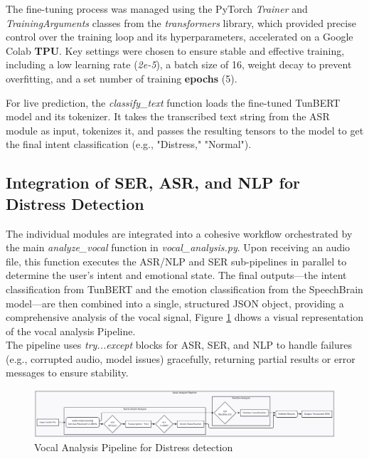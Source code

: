 \documentclass[12pt,a4paper,oneside,english]{book}
\begin{document}
{The fine-tuning process was managed using the PyTorch \textit{Trainer} and \textit{TrainingArguments} classes from the \textit{transformers} library, which provided precise control over the training loop and its hyperparameters, accelerated on a Google Colab \textbf{TPU}. 
Key settings were chosen to ensure stable and effective training, including a low learning rate (\textit{2e-5}), 
a batch size of 16, weight decay to prevent overfitting, and a set number of training \textbf{epochs} (5).

For live prediction, the \textit{classify\_text} function loads the fine-tuned TunBERT model and its tokenizer. It takes the transcribed text string from the ASR module as input, tokenizes it, and passes the 
resulting tensors to the model to get the final intent classification (e.g., "Distress," "Normal").

\subsection{Integration of SER, ASR, and NLP for Distress Detection}%
\label{integration_ser_asr_nlp}
The individual modules are integrated into a cohesive workflow orchestrated by the main \textit{analyze\_vocal} function in \textit{vocal\_analysis.py}. Upon receiving an audio file, this function 
executes the ASR/NLP and SER sub-pipelines in parallel to determine the user's intent and emotional state. The final outputs—the intent classification from TunBERT and the emotion classification from 
the SpeechBrain model—are then combined into a single, structured JSON object, providing a comprehensive analysis of the vocal signal, Figure \ref{fig:vocal_pipe} dhows a visual representation of the vocal analysis Pipeline.
\\The pipeline uses \textit{try...except} blocks for ASR, SER, and NLP to handle failures (e.g., corrupted audio, model issues) gracefully, returning partial results or error messages to ensure stability.

\begin{figure}[h!] %
    \centering
    \includegraphics[width=1\textwidth]{images/vocal_analysis_pipeline.png}
    \caption{Vocal Analysis Pipeline for  Distress detection}
    \label{fig:vocal_pipe}
\end{figure}

}
\end{document}
